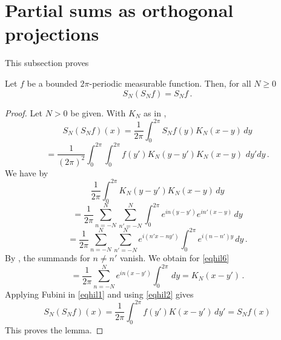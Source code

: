 \section{Partial sums as orthogonal projections}
\label{10projection}

This subsection proves 






\begin{lemma}
\label{partial-sum-projection}
\leanok
{}
  Let $f$ be a bounded $2\pi$-periodic measurable function. Then, for all $N\ge 0$
   \begin{equation}\label{projection}
   S_N(S_N f)=S_Nf\, .
   \end{equation}
   \end{lemma}
\begin{proof}
Let $N>0$ be given. With $K_N$ as in ,
\begin{equation*}
S_N (S_Nf) (x)=
\frac{1}{2\pi} \int_0^{2\pi} S_Nf(y)K_N(x-y)\, dy
\end{equation*}
\begin{equation}\label{eqhil1}
=
\frac{1}{(2\pi)^2}\int_0^{2\pi} \int_0^{2\pi} f(y')K_N(y-y') K_N(x-y)\, \, dy' dy\, .
\end{equation}
We have by 
\begin{equation*}
\frac{1}{2\pi}\int_0^{2\pi} K_N(y-y') K_N(x-y)\, dy
\end{equation*}
\begin{equation*}
=\frac{1}{2\pi}\sum_{n=-N}^N\sum_{n'=-N}^N
\int_0^{2\pi} e^{in(y-y')}e^{in'(x-y)}\, dy
\end{equation*}
\begin{equation}\label{eqhil6}
=\frac{1}{2\pi}\sum_{n=-N}^N\sum_{n'=-N}^N
e^{i(n'x-ny')}\int_0^{2\pi} e^{i(n-n')y}\, dy\, .
\end{equation}
By , the summands for $n\neq n'$ vanish.
We obtain for \eqref{eqhil6}
\begin{equation}\label{eqhil2}
=\frac{1}{2\pi}\sum_{n=-N}^N
e^{in(x-y')}\int_0^{2\pi} \, dy=K_N(x-y')\, .
\end{equation}
Applying Fubini in \eqref{eqhil1} and using
\eqref{eqhil2} gives
\begin{equation}
S_N(S_Nf)(x)=
\frac{1}{2\pi} \int_0^{2\pi} f(y')K(x-y') \, dy'=S_N f(x)
\end{equation}
This proves the lemma.
\end{proof}
